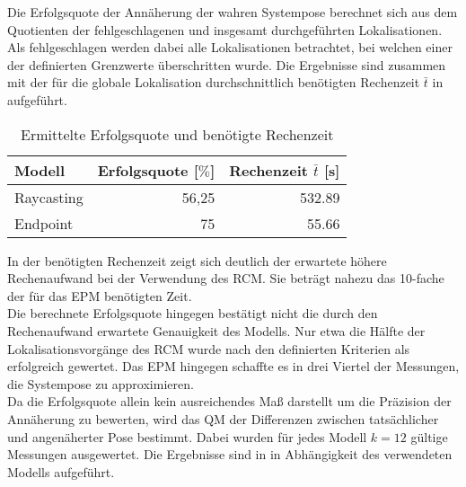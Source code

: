 Die Erfolgsquote der Annäherung der wahren Systempose berechnet sich aus dem Quotienten der fehlgeschlagenen und insgesamt durchgeführten Lokalisationen. Als fehlgeschlagen werden dabei alle Lokalisationen betrachtet, bei welchen einer der definierten Grenzwerte überschritten wurde. Die Ergebnisse sind zusammen mit der für die globale Lokalisation durchschnittlich benötigten Rechenzeit $\bar{t}$ in  aufgeführt.

\begin{table}[ht]
	\centering
	\caption{Ermittelte Erfolgsquote und benötigte Rechenzeit}
	\label{tab.approx_time}
	\vspace*{-3mm}
	\begin{tabular}[ht]{|l|r|r|}\hline
		\rowcolor{Snow2}
		Modell			& Erfolgsquote [$\%$]	&	Rechenzeit $\bar{t}$	 [s]	\\ \hline
		Raycasting		& 56,25					&	\SI{532,89}{}			\\ \hline		
		Endpoint			& 75						&	\SI{55,66}{}			\\ \hline
	\end{tabular} 
\end{table}

In der benötigten Rechenzeit zeigt sich deutlich der erwartete höhere Rechenaufwand bei der Verwendung des RCM. Sie beträgt nahezu das \SI{10}{}-fache der für das EPM benötigten Zeit.\\
Die berechnete Erfolgsquote hingegen bestätigt nicht die durch den Rechenaufwand erwartete Genauigkeit des Modells. Nur etwa die Hälfte der Lokalisationsvorgänge des RCM wurde nach den definierten Kriterien als erfolgreich gewertet. Das EPM hingegen schaffte es in drei Viertel der Messungen, die Systempose zu approximieren.\\

%

Da die Erfolgsquote allein kein ausreichendes Maß darstellt um die Präzision der Annäherung zu bewerten, wird das QM der Differenzen zwischen tatsächlicher und angenäherter Pose bestimmt. Dabei wurden für jedes Modell $k=12$ gültige Messungen ausgewertet. Die Ergebnisse sind in  in Abhängigkeit des verwendeten Modells aufgeführt.\\

